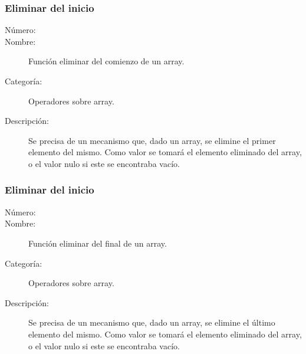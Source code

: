 \subsubsection{Eliminar del inicio}
	\begin{description}
		\item [Número:] \cn
		\item [Nombre:] Función eliminar del comienzo de un array.
		\item [Categoría:] Operadores sobre array.
		\item [Descripción:] Se precisa de un mecanismo que, dado un array, se elimine
el primer elemento del mismo. Como valor se tomará el elemento eliminado del array, o el valor nulo si este se encontraba vacío.
	\end {description}


\subsubsection{Eliminar del inicio}
	\begin{description}
		\item [Número:] \cn
		\item [Nombre:] Función eliminar del final de un array.
		\item [Categoría:] Operadores sobre array.
		\item [Descripción:] Se precisa de un mecanismo que, dado un array, se elimine
el último elemento del mismo. Como valor se tomará el elemento eliminado del array, o el valor nulo si este se encontraba vacío.
	\end {description}
